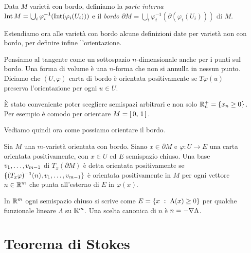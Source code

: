 \begin{definition}  
	Data $M$ varietà con bordo, definiamo la \emph{parte interna} $\Int M = \bigcup_{i} \varphi_i^{-1}(\Int (\varphi_i(U_i)))$ e il \emph{bordo} $\partial M = \bigcup_i \varphi_i^{-1}(\partial (\varphi_i(U_i)))$ di $M$.
\end{definition}

Estendiamo ora alle varietà con bordo alcune definizioni date per varietà non con bordo, per definire infine l'orientazione.

Pensiamo al tangente come un sottospazio $n$-dimensionale anche per i punti sul bordo.
Una forma di volume è una $n$-forma che non si annulla in nessun punto. Diciamo che $(U,\varphi)$ carta di bordo è orientata positivamente se $T\varphi(u)$ preserva l'orientazione per ogni $u\in U$.

\begin{remark}
	È stato conveniente poter scegliere semispazi arbitrari e non solo $\R_n^+ = \{x_n\ge 0\}$. Per esempio è comodo per orientare $M = \cc 01$.
\end{remark}

Vediamo quindi ora come possiamo orientare il bordo.
\begin{definition}
	Sia $M$ una $m$-varietà orientata con bordo. Siano $x\in \partial M$ e $\varphi:U \to E$ una carta orientata positivamente, con $x\in U$ ed $E$ semispazio chiuso. Una base $\seqb v{m-1},$ di $T_x(\partial M)$ è detta orientata positivamente se $\{ (T_x\varphi)^{-1} (n), \seqb v{m-1}, \}$ è orientata positivamente in $M$ per ogni vettore $n\in\R^m$ che punta all'esterno di $E$ in $\varphi(x)$.
\end{definition}

\begin{remark}
	In $\R^m$ ogni semispazio chiuso si scrive come $E = \{x \suchthat \Lambda(x) \ge 0\}$ per qualche funzionale lineare $\Lambda$ su $\R^m$. Una scelta canonica di $n$ è $n = -\grad \Lambda$.
\end{remark}



\section{Teorema di Stokes}

